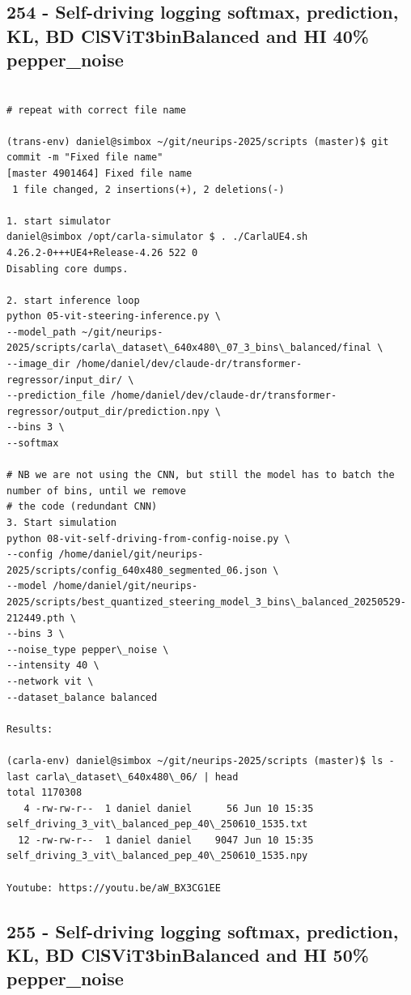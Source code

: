 \subsection{254 - Self-driving logging softmax, prediction, KL, BD ClSViT3binBalanced and HI 40\% pepper\_noise}
\label{app_res:254}
\begin{verbatim}

# repeat with correct file name

(trans-env) daniel@simbox ~/git/neurips-2025/scripts (master)$ git commit -m "Fixed file name"
[master 4901464] Fixed file name
 1 file changed, 2 insertions(+), 2 deletions(-)
 
1. start simulator
daniel@simbox /opt/carla-simulator $ . ./CarlaUE4.sh 
4.26.2-0+++UE4+Release-4.26 522 0
Disabling core dumps.

2. start inference loop
python 05-vit-steering-inference.py \
--model_path ~/git/neurips-2025/scripts/carla\_dataset\_640x480\_07_3_bins\_balanced/final \
--image_dir /home/daniel/dev/claude-dr/transformer-regressor/input_dir/ \
--prediction_file /home/daniel/dev/claude-dr/transformer-regressor/output_dir/prediction.npy \
--bins 3 \
--softmax

# NB we are not using the CNN, but still the model has to batch the number of bins, until we remove
# the code (redundant CNN)
3. Start simulation
python 08-vit-self-driving-from-config-noise.py \
--config /home/daniel/git/neurips-2025/scripts/config_640x480_segmented_06.json \
--model /home/daniel/git/neurips-2025/scripts/best_quantized_steering_model_3_bins\_balanced_20250529-212449.pth \
--bins 3 \
--noise_type pepper\_noise \
--intensity 40 \
--network vit \
--dataset_balance balanced

Results:

(carla-env) daniel@simbox ~/git/neurips-2025/scripts (master)$ ls -last carla\_dataset\_640x480\_06/ | head
total 1170308
   4 -rw-rw-r--  1 daniel daniel      56 Jun 10 15:35 self_driving_3_vit\_balanced_pep_40\_250610_1535.txt
  12 -rw-rw-r--  1 daniel daniel    9047 Jun 10 15:35 self_driving_3_vit\_balanced_pep_40\_250610_1535.npy

Youtube: https://youtu.be/aW_BX3CG1EE

\end{verbatim}

\subsection{255 - Self-driving logging softmax, prediction, KL, BD ClSViT3binBalanced and HI 50\% pepper\_noise}
\label{app_res:255}

